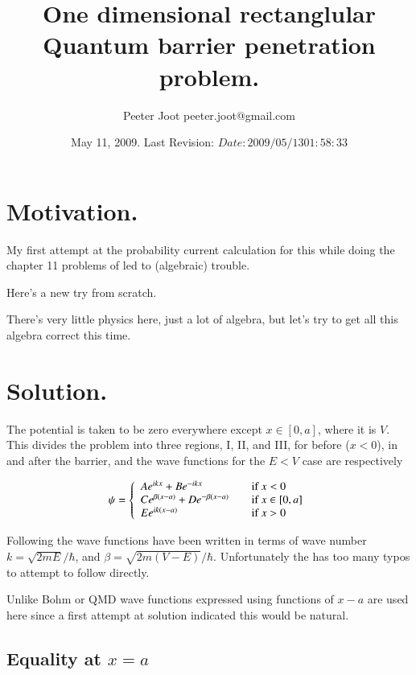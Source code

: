 \documentclass{article}
\title{ One dimensional rectanglular Quantum barrier penetration problem. }
\author{Peeter Joot \quad peeter.joot@gmail.com }
\date{ May 11, 2009.  Last Revision: $Date: 2009/05/13 01:58:33 $ }
\begin{document}
\maketitle{}
\tableofcontents
\section{ Motivation. }

My first attempt at the probability current calculation for this
while doing the chapter 11 problems of \cite{bohm1989qt} led to (algebraic) trouble.

Here's a new try from scratch.

There's very little physics here, just a lot of algebra, but let's try
to get all this algebra correct this time.

\section{ Solution. }

The potential is taken to be zero everywhere except $x \in [0,a]$, where it is
$V$.  This divides the problem into three regions, I, II, and III, for 
before ($x<0$), in and after the barrier, and the wave functions for the 
$E <V$ case are respectively

\begin{equation}
\psi =
\left\{
\begin{array}{l l}
A e^{i k x} + B e^{-i k x} & \quad \mbox{if $x <0$} \\
C e^{ \beta(x-a)} + D e^{ -\beta(x-a)} & \quad \mbox{if $x \in [0,a]$} \\
E e^{i k(x-a)} & \quad \mbox{if $x >0$} \\
\end{array}
\right.
\end{equation}

Following \cite{mcmahon2005qmd} the wave functions have been written in terms of wave number 
$k = \sqrt{2 m E}/\hbar$, and $\beta = \sqrt{2 m (V-E)}/\hbar$.  Unfortunately the 
\cite{mcmahon2005qmd} has too many typos to attempt to follow directly.

Unlike Bohm or QMD wave functions expressed using functions of $x-a$ are used here since a first
attempt at solution indicated this would be natural.

\subsection{ Equality at $x=a$ }
\end{document}
